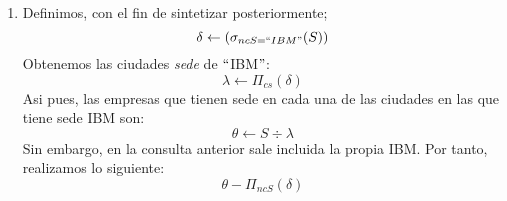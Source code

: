 \begin{enumerate}
	\item Definimos, con el fin de sintetizar posteriormente;
	$$\delta \leftarrow (\sigma_{ncS = ``IBM"} (S))$$
	Obtenemos las ciudades \textit{sede} de $``$IBM$"$:
	$$\lambda \leftarrow \Pi_{cs}(\delta)$$
	Asi pues, las empresas que tienen sede en cada una de las ciudades en las que tiene sede IBM son:
	$$\theta \leftarrow S \div \lambda$$
	Sin embargo, en la consulta anterior sale incluida la propia IBM. Por tanto, realizamos lo siguiente:
	$$\theta - \Pi_{ncS}(\delta)$$
	
\end{enumerate}
